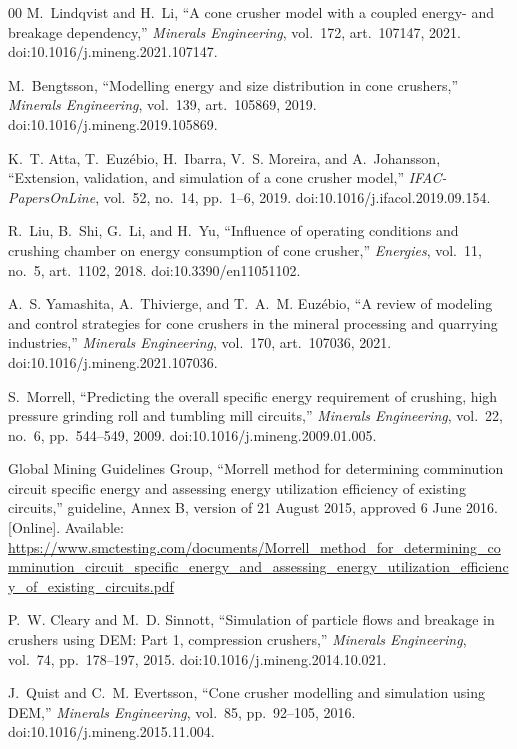 \documentclass[journal]{IEEEtran}
\begin{document}
\begin{thebibliography}{00}
 M.~Lindqvist and H.~Li, ``A cone crusher model with a coupled energy- and breakage dependency,''
\emph{Minerals Engineering}, vol.~172, art.~107147, 2021. doi:10.1016/j.mineng.2021.107147.

 M.~Bengtsson, ``Modelling energy and size distribution in cone crushers,'' \emph{Minerals
Engineering}, vol.~139, art.~105869, 2019. doi:10.1016/j.mineng.2019.105869.

 K.~T. Atta, T.~Euz\'ebio, H.~Ibarra, V.~S. Moreira, and A.~Johansson, ``Extension, validation, and
simulation of a cone crusher model,'' \emph{IFAC-PapersOnLine}, vol.~52, no.~14, pp.~1--6, 2019.
doi:10.1016/j.ifacol.2019.09.154.

 R.~Liu, B.~Shi, G.~Li, and H.~Yu, ``Influence of operating conditions and crushing chamber on energy
consumption of cone crusher,'' \emph{Energies}, vol.~11, no.~5, art.~1102, 2018. doi:10.3390/en11051102.

 A.~S. Yamashita, A.~Thivierge, and T.~A.~M. Euz\'ebio, ``A review of modeling and control strategies
for cone crushers in the mineral processing and quarrying industries,'' \emph{Minerals Engineering}, vol.~170,
art.~107036, 2021. doi:10.1016/j.mineng.2021.107036.

 S.~Morrell, ``Predicting the overall specific energy requirement of crushing, high pressure grinding roll
and tumbling mill circuits,'' \emph{Minerals Engineering}, vol.~22, no.~6, pp.~544--549, 2009.
doi:10.1016/j.mineng.2009.01.005.

 Global Mining Guidelines Group, ``Morrell method for determining comminution circuit specific energy and
assessing energy utilization efficiency of existing circuits,'' guideline, Annex B, version of 21 August 2015, approved 6 June
2016. [Online]. Available:
\url{https://www.smctesting.com/documents/Morrell_method_for_determining_comminution_circuit_specific_energy_and_assessing_energy_utilization_efficiency_of_existing_circuits.pdf}

 P.~W. Cleary and M.~D. Sinnott, ``Simulation of particle flows and breakage in crushers using DEM: Part 1,
compression crushers,'' \emph{Minerals Engineering}, vol.~74, pp.~178--197, 2015. doi:10.1016/j.mineng.2014.10.021.

 J.~Quist and C.~M. Evertsson, ``Cone crusher modelling and simulation using DEM,'' \emph{Minerals
Engineering}, vol.~85, pp.~92--105, 2016. doi:10.1016/j.mineng.2015.11.004.


\end{thebibliography}
\end{document}
